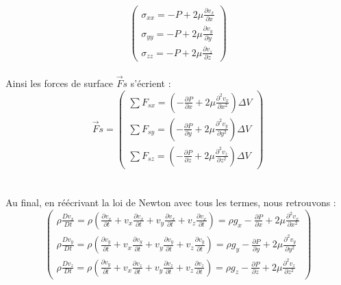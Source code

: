 \documentclass{article}
\begin{document}
\begin{equation}
\left(
\begin{array}{l}
\sigma_{xx} = -P + 2 \mu \frac{\partial v_{x}}{\partial x} \\
\sigma_{yy} = -P + 2 \mu \frac{\partial v_{y}}{\partial y} \\
\sigma_{zz} = -P + 2 \mu \frac{\partial v_{z}}{\partial z}
\end{array}
\right)
\end{equation}
\\
Ainsi les forces de surface $\vec{F}s$ s'écrient : 
\begin{equation}
\vec{F}s = 
\left(
\begin{array}{l}
\sum F_{sx} = (-\frac{\partial P}{\partial x} + 2\mu \frac{\partial^2v_{x}}{\partial x^2})\Delta V  \\
\sum F_{sy} = (-\frac{\partial P}{\partial y} + 2\mu \frac{\partial^2v_{y}}{\partial y^2})\Delta V \\
\sum F_{sz} = (-\frac{\partial P}{\partial z} + 2\mu \frac{\partial^2v_{z}}{\partial z^2})\Delta V
\end{array}
\right)
\end{equation}
\\\\
Au final, en réécrivant la loi de Newton avec tous les termes, nous retrouvons :
\begin{equation}
\left(
\begin{array}{l}
\rho \frac{D v_{x}}{Dt} = \rho(\frac{\partial v_{x}}{\partial t} + v_{x} \frac{\partial v_{x}}{\partial t} + v_{y} \frac{\partial v_{x}}{\partial t} + v_{z} \frac{\partial v_{x}}{\partial t}) = \rho g_{x} - \frac{\partial P}{\partial x} + 2\mu \frac{\partial^2v_{x}}{\partial x^2}  \\
\rho \frac{D v_{y}}{Dt} = \rho(\frac{\partial v_{y}}{\partial t} + v_{x} \frac{\partial v_{y}}{\partial t} + v_{y} \frac{\partial v_{y}}{\partial t} + v_{z} \frac{\partial v_{y}}{\partial t}) =  \rho g_{y} - \frac{\partial P}{\partial y} + 2\mu \frac{\partial^2v_{y}}{\partial y^2} \\
\rho \frac{D v_{z}}{Dt} = \rho(\frac{\partial v_{y}}{\partial t} + v_{x} \frac{\partial v_{z}}{\partial t} + v_{y} \frac{\partial v_{z}}{\partial t} + v_{z} \frac{\partial v_{z}}{\partial t}) = \rho g_{z} - \frac{\partial P}{\partial z} + 2\mu \frac{\partial^2v_{z}}{\partial z^2}
\end{array}
\right)
\end{equation}
\\
\end{document}
